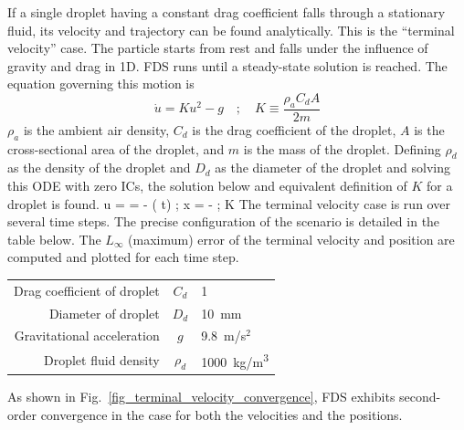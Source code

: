 \documentclass[11pt]{book}
\begin{document}
If a single droplet having a constant drag coefficient falls through a stationary fluid, its velocity and trajectory can be found analytically.
This is the ``terminal velocity'' case. The particle starts from rest and falls under the influence of gravity and drag in 1D.
FDS runs until a steady-state solution is reached. The equation governing this motion is
\[
    \dot{u} = K u^2 - g \quad ; \quad K \equiv \frac{\rho_a C_d A}{2 m}
\]
$\rho_a$ is the ambient air density, $C_d$ is the drag coefficient of the droplet, $A$ is the cross-sectional area of the droplet, and $m$ is the mass of the droplet.
Defining $\rho_d$ as the density of the droplet and $D_d$ as the diameter of the droplet and solving this ODE with zero ICs,
the solution below and equivalent definition of $K$ for a droplet is found.
\be
    u =  = -  \left( t\right) \quad ; \quad
    x = -  \quad ; \quad
    K \equiv {}
\ee
The terminal velocity case is run over several time steps. The precise configuration of the scenario is detailed in the table below.
The $L_\infty$ (maximum) error of the terminal velocity and position are computed and plotted for each time step.
\begin{center}
\begin{tabular}{|r|c|l|}
\hline
Drag coefficient of droplet & $C_d$ & 1 \\
Diameter of droplet & $D_d$ & 10~mm \\
Gravitational acceleration & $g$ & 9.8~m/s$^2$ \\
Droplet fluid density & $\rho_d$ & 1000~\si{kg/m^3} \\
\hline
\end{tabular}
\end{center}
As shown in Fig.~\ref{fig_terminal_velocity_convergence}, FDS exhibits second-order convergence in the  case for both the velocities and the positions.
\end{document}
